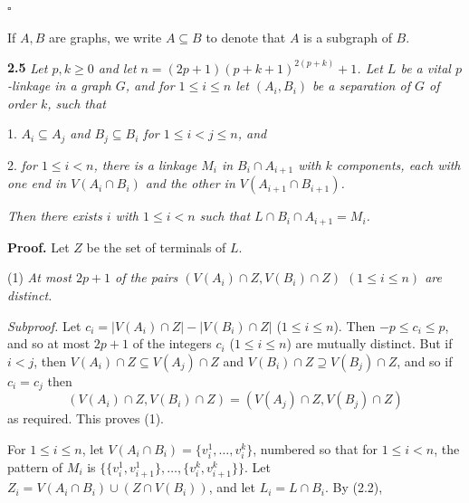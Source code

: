 $\square$

If $A, B$ are graphs, we write $A \subseteq B$ to denote that $A$ is a subgraph of $B$.

\textbf{2.5} \textit{Let $p, k \ge 0$ and let $n = (2p + 1)(p + k + 1)^{2(p+k)} + 1$. Let $L$ be a vital $p$-linkage in a graph $G$, and for $1 \le i \le n$ let $(A_i, B_i)$ be a separation of $G$ of order $k$, such that}

\hspace*{12pt}1. \textit{$A_i \subseteq A_j$ and $B_j \subseteq B_i$ for $1 \le i < j \le n$, and}

\hspace*{12pt}2. \textit{for $1 \le i < n$, there is a linkage $M_i$ in $B_i \cap A_{i+1}$ with $k$ components, each with one end in $V(A_i \cap B_i)$ and the other in $V(A_{i+1} \cap B_{i+1})$.}

\textit{Then there exists $i$ with $1 \le i < n$ such that $L \cap B_i \cap A_{i+1} = M_i$.}

\textbf{Proof.} Let $Z$ be the set of terminals of $L$.

\hspace*{12pt}(1) \textit{At most $2p + 1$ of the pairs $(V(A_i) \cap Z, V(B_i) \cap Z)$ $(1 \le i \le n)$ are distinct.}

\textit{Subproof.} Let $c_i = |V(A_i) \cap Z| - |V(B_i) \cap Z|$ ($1 \le i \le n$). Then $-p \le c_i \le p$, and so at most $2p + 1$ of the integers $c_i$ ($1 \le i \le n$) are mutually distinct. But if $i < j$, then $V(A_i) \cap Z \subseteq V(A_j) \cap Z$ and $V(B_i) \cap Z \supseteq V(B_j) \cap Z$, and so if $c_i = c_j$ then
\begin{equation*}
(V(A_i) \cap Z, V(B_i) \cap Z) = (V(A_j) \cap Z, V(B_j) \cap Z)
\end{equation*}
as required. This proves (1).

For $1 \le i \le n$, let $V(A_i \cap B_i) = \{v_i^1, \dots, v_i^k\}$, numbered so that for $1 \le i < n$, the pattern of $M_i$ is $\{\{v_i^1, v_{i+1}^1\}, \dots, \{v_i^k, v_{i+1}^k\}\}$. Let $Z_i = V(A_i \cap B_i) \cup (Z \cap V(B_i))$, and let $L_i = L \cap B_i$. By (2.2),

